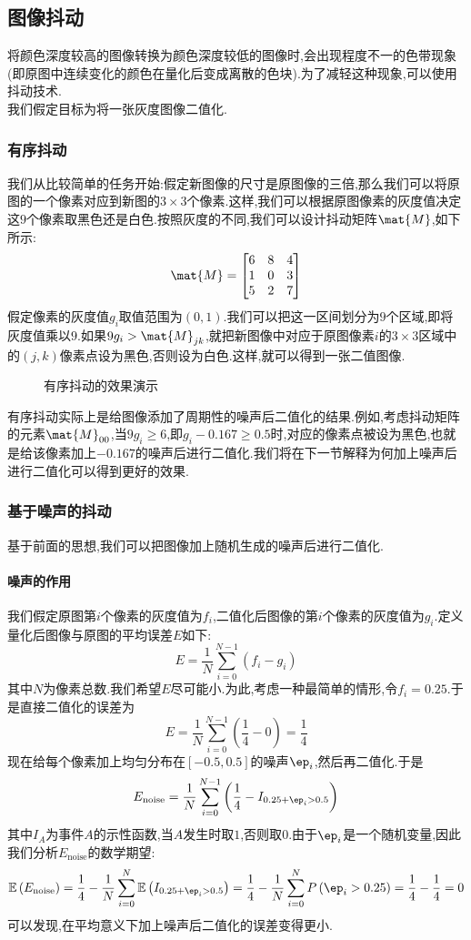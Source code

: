 \documentclass{ctexart}
\begin{document}
\subsection{图像抖动}
将颜色深度较高的图像转换为颜色深度较低的图像时,会出现程度不一的色带现象(即原图中连续变化的颜色在量化后变成离散的色块).为了减轻这种现象,可以使用抖动技术.\\
\indent 我们假定目标为将一张灰度图像二值化.
\subsubsection{有序抖动}
我们从比较简单的任务开始:假定新图像的尺寸是原图像的三倍,那么我们可以将原图的一个像素对应到新图的$3\times3$个像素.这样,我们可以根据原图像素的灰度值决定这$9$个像素取黑色还是白色.按照灰度的不同,我们可以设计抖动矩阵$\mat{M}$,如下所示:
\[\mat{M} = \begin{bmatrix}
    6 & 8 & 4 \\
    1 & 0 & 3 \\
    5 & 2 & 7
\end{bmatrix}\]
假定像素的灰度值$g_i$取值范围为$(0,1)$.我们可以把这一区间划分为$9$个区域,即将灰度值乘以$9$.如果$9g_i>\mat{M}_{jk}$,就把新图像中对应于原图像素$i$的$3\times3$区域中的$(j,k)$像素点设为黑色,否则设为白色.这样,就可以得到一张二值图像.
\begin{figure}[H]
    \centering{}\quad\quad
    \caption{有序抖动的效果演示}
\end{figure}
有序抖动实际上是给图像添加了周期性的噪声后二值化的结果.例如,考虑抖动矩阵的元素$\mat{M}_{00}$,当$9g_{i}\geqslant6$,即$g_i-0.167\geqslant0.5$时,对应的像素点被设为黑色,也就是给该像素加上$-0.167$的噪声后进行二值化.我们将在下一节解释为何加上噪声后进行二值化可以得到更好的效果.
\subsubsection{基于噪声的抖动}
基于前面的思想,我们可以把图像加上随机生成的噪声后进行二值化.
\paragraph{噪声的作用}
我们假定原图第$i$个像素的灰度值为$f_i$,二值化后图像的第$i$个像素的灰度值为$g_i$.定义量化后图像与原图的平均误差$E$如下:
\[E=\dfrac{1}{N}\sum_{i=0}^{N-1}\left(f_i-g_i\right)\]
其中$N$为像素总数.我们希望$E$尽可能小.为此,考虑一种最简单的情形,令$f_i=0.25$.于是直接二值化的误差为
\[E=\dfrac{1}{N}\sum_{i=0}^{N-1}\left(\dfrac14-0\right)=\dfrac14\]
现在给每个像素加上均匀分布在$[-0.5,0.5]$的噪声$\ep_i$,然后再二值化.于是
\[E_{\text{noise}}=\dfrac{1}{N}\sum_{i=0}^{N-1}\left(\dfrac14-I_{0.25+\ep_i>0.5}\right)\]
其中$I_A$为事件$A$的示性函数,当$A$发生时取$1$,否则取$0$.由于$\ep_i$是一个随机变量,因此我们分析$E_{\text{noise}}$的数学期望:
\[\mathbb{E}\left(E_{\text{noise}}\right)
= \dfrac14-\dfrac{1}{N}\sum_{i=0}^{N}\mathbb{E}\left(I_{0.25+\ep_i>0.5}\right)
= \dfrac14-\dfrac{1}{N}\sum_{i=0}^{N}P\left(\ep_i>0.25\right)
= \dfrac14-\dfrac14=0\]
可以发现,在平均意义下加上噪声后二值化的误差变得更小.
\end{document}
